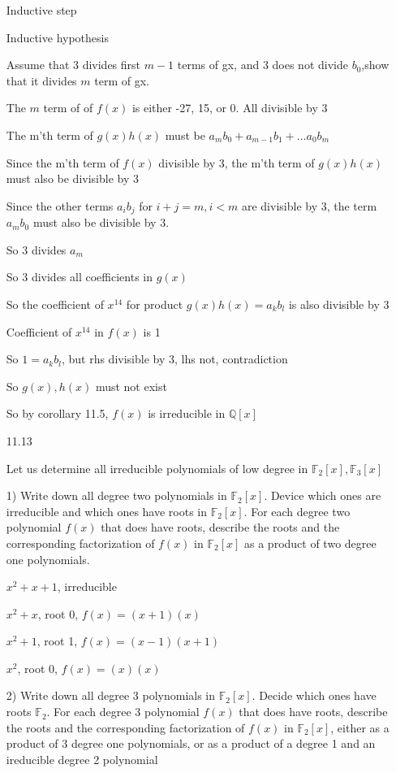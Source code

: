 \documentclass[12pt]{article}
\begin{document}
\begin{itemize}
	Inductive step

	Inductive hypothesis

	Assume that 3 divides first $m-1$ terms of gx, and 3 does not divide $b_0$,show that it divides $m$ term of gx. 

	The $m$ term of of $f(x)$ is either -27, 15, or 0. All divisible by 3

	The m'th term of $g(x)h(x)$ must be $a_m b_0 + a_{m-1} b_1 + ... a_0 b_m$

	Since the m'th term of $f(x)$ divisible by 3, the m'th term of $g(x)h(x)$ must also be divisible by 3

	Since the other terms $a_i b_j$ for $i + j = m, i < m$ are divisible by 3, the term $a_m b_0$ must also be divisible by 3.

	So 3 divides $a_m$

	So 3 divides all coefficients in $g(x)$

	So the coefficient of $x^{14}$ for product $g(x)h(x) = a_k b_l$ is also divisible by 3

		Coefficient of $x^{14}$ in $f(x)$ is 1

	So	$1 = a_k b_l$, but rhs divisible by 3, lhs not, contradiction

	So $g(x),h(x)$ must not exist

	So by corollary 11.5, $f(x)$ is irreducible in $\mathbb{Q}[x]$

\newpage
\item[11.13]

Let us determine all irreducible polynomials of low degree in $\mathbb{F}_2[x], \mathbb{F}_3[x]$

1) Write down all degree two polynomials in $\mathbb{F}_2[x]$. Device which ones are irreducible and which ones have roots in $\mathbb{F}_2[x]$. For each degree two polynomial $f(x)$ that does have roots, describe the roots and the corresponding factorization of $f(x)$ in $\mathbb{F}_2[x]$ as a product of two degree one polynomials. 

$x^2 + x + 1$, irreducible

$x^2 + x$, root 0, $f(x) = (x+1)(x)$

$x^2 + 1$, root 1, $f(x) = (x-1)(x+1)$

$x^2$, root 0, $f(x) = (x)(x)$

2) Write down all degree 3 polynomials in $\mathbb{F}_2[x].$ Decide which ones have roots $\mathbb{F}_2$. For each degree 3 polynomial $f(x)$ that does have roots, describe the roots and the corresponding factorization of $f(x)$ in $\mathbb{F}_2[x]$, either as a product of 3 degree one polynomials, or as a product of a degree 1 and an ireducible degree 2 polynomial


\end{itemize}
\end{document}
